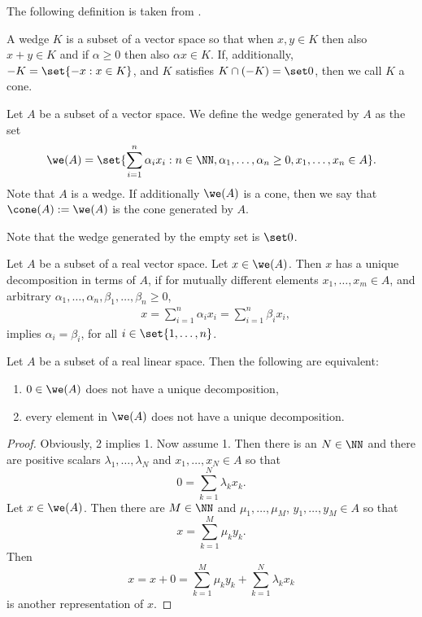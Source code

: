 \documentclass[12pt,a4paper]{article}
\begin{document}
The following definition is taken from \cite[Definition 1.1.1]{KalauchvanGaans2018}. 

\begin{definition}\label{def:coneandwedge}
    A wedge $K$ is a subset of a vector space so that when $x,y\in K$ then also $x+y\in K$ and if $\alpha\ge 0$ then also $\alpha x \in K$. If, additionally, $-K= \set{-x : x\in K}$, and $K$ satisfies $K\cap (-K)=\set 0$, then we call $K$ a cone.  
\end{definition}

\begin{definition}\label{def:wedgeorconegeneratedbysetA}
    Let $A$ be a subset of a vector space. We define the wedge generated by $A$ as the set \begin{align*}
     \we(A)=   \set{\sum_{i=1}^n \alpha_i x_i: n\in\NN, \alpha_1,\ldots,\alpha_n\ge 0, x_1,\ldots,x_n\in A}.
    \end{align*}
    Note that $A$ is a wedge. If additionally  $\we(A)$ is a cone, then we say that $\cone(A):=\we(A)$ is the cone generated by $A$. 
\end{definition}
Note that the wedge generated by the empty set is $\set 0$. 

\begin{definition}\label{def:uniquedecompositionwedgeorcone}
    Let $A$ be a subset of a real vector space. Let $x\in \we(A)$. Then $x$ has a unique decomposition in terms of $A$, if for mutually different elements $x_1,\ldots,x_m\in A$, and arbitrary  $\alpha_1,\ldots,\alpha_n,\beta_1,\ldots,\beta_n\ge 0$, 
    \begin{align*}
        &x=\sum_{i=1}^n \alpha_i x_i = \sum_{i=1}^n \beta_i x_i,     \end{align*}
    implies $\alpha_i=\beta_i$, for all $i\in\set{1,\ldots,n}$. 
\end{definition}

\begin{lemma}
    Let $A$ be a subset of a real linear space. Then the following are equivalent:
    \begin{enumerate}
        \item $0\in \we(A)$ does not have a unique decomposition,
        \item every element in $\we(A)$ does not have a unique decomposition.  
    \end{enumerate}
\end{lemma}
\begin{proof}
    Obviously, 2 implies 1. Now assume 1. Then there is an $N\in \NN$ and there are  positive scalars $\lambda_1,\ldots,\lambda_N$ and $x_1,\ldots,x_N\in A$ so that \[
    0 = \sum_{k=1}^N \lambda_k x_k. 
    \]
    Let $x\in \we(A)$. Then there are $M\in \NN$ and $\mu_1,\ldots,\mu_M$, $y_1,\ldots,y_M\in A$ so that \[
    x = \sum_{k=1}^M \mu_ky_k.
    \]
    Then \[
    x=x+0=\sum_{k=1}^M \mu_ky_k + \sum_{k=1}^N \lambda_k x_k
    \]
    is another representation of $x$. 
\end{proof}
\end{document}
